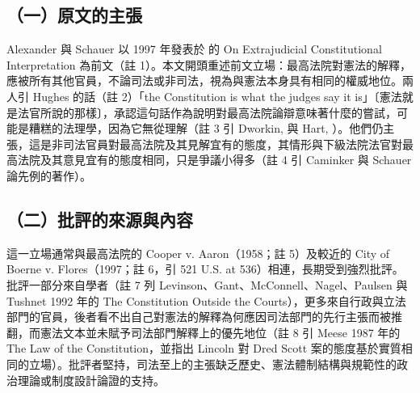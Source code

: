\subsection{（一）原文的主張}

Alexander 與 Schauer 以 1997 年發表於  的 On Extrajudicial Constitutional Interpretation 為前文（註 1）。本文開頭重述前文立場：最高法院對憲法的解釋，應被所有其他官員，不論司法或非司法，視為與憲法本身具有相同的權威地位。兩人引 Hughes 的話（註 2）「the Constitution is what the judges say it is」〔憲法就是法官所說的那樣〕，承認這句話作為說明對最高法院論辯意味著什麼的嘗試，可能是糟糕的法理學，因為它無從理解（註 3 引 Dworkin,  與 Hart, ）。他們仍主張，這是非司法官員對最高法院及其見解宜有的態度，其情形與下級法院法官對最高法院及其意見宜有的態度相同，只是爭議小得多（註 4 引 Caminker 與 Schauer 論先例的著作）。

\subsection{（二）批評的來源與內容}

這一立場通常與最高法院的 Cooper v. Aaron（1958；註 5）及較近的 City of Boerne v. Flores（1997；註 6，引 521 U.S. at 536）相連，長期受到強烈批評。批評一部分來自學者（註 7 列 Levinson、Gant、McConnell、Nagel、Paulsen 與 Tushnet 1992 年的 The Constitution Outside the Courts），更多來自行政與立法部門的官員，後者看不出自己對憲法的解釋為何應因司法部門的先行主張而被推翻，而憲法文本並未賦予司法部門解釋上的優先地位（註 8 引 Meese 1987 年的 The Law of the Constitution，並指出 Lincoln 對 Dred Scott 案的態度基於實質相同的立場）。批評者堅持，司法至上的主張缺乏歷史、憲法體制結構與規範性的政治理論或制度設計論證的支持。

